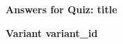 \documentclass[12pt]{article}
\begin{document}
\begin{center}
    \Large\textbf{Answers for Quiz: {{ title }}}
\end{center}

\vspace{1em}

\begin{center}
    \Large\textbf{Variant {{ variant_id }}}
\end{center}

\vspace{1em}

\end{document}
